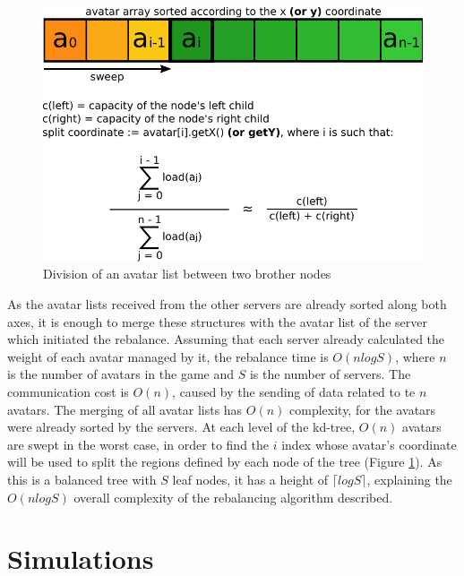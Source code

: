 \documentclass[acmjacm]{acmtrans2m}
\newcommand{\figurecaption}{Figure}
\begin{document}
\begin{figure}
  \centering
  \includegraphics[width=0.8\linewidth]{images/balancenode}
  \caption{Division of an avatar list between two brother nodes}
   \label{fig:balancenode}
\end{figure}

As the avatar lists received from the other servers are already sorted along both axes, it is enough to merge these structures with the avatar list of the server which initiated the rebalance. Assuming that each server already calculated the weight of each avatar managed by it, the rebalance time is  $O(nlogS)$, where $n$ is the number of avatars in the game and $S$ is the number of servers. The communication cost is $O(n)$, caused by the sending of data related to te $n$ avatars. The merging of all avatar lists has $O(n)$ complexity, for the avatars were already sorted by the servers. At each level of the kd-tree, $O(n)$ avatars are swept in the worst case, in order to find the $i$ index whose avatar's coordinate will be used to split the regions defined by each node of the tree (\figurecaption{} \ref{fig:balancenode}). As this is a balanced tree with $S$ leaf nodes, it has a height of $\lceil logS \rceil$, explaining the $O(nlogS)$ overall complexity of the rebalancing algorithm described.

\section{Simulations}
\label{sec:simul}
\end{document}
